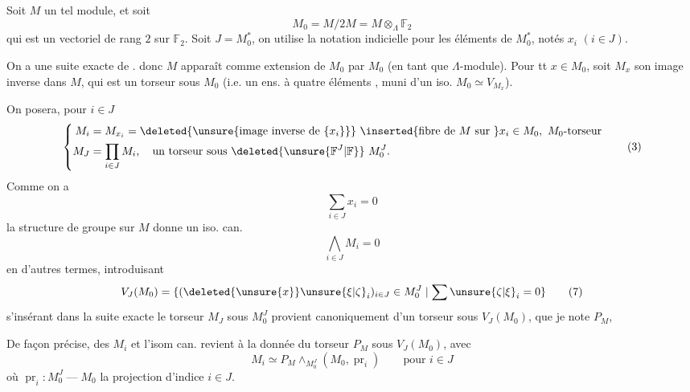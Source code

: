 Soit $M$ un tel module, et soit
\[
M_0=M/2M=M\otimes_\Lambda\mathbb F_2 \tag*{(1)}
\]
qui est un vectoriel de rang $2$ sur $\mathbb F_2$. Soit $J=M_0^*$, on utilise la notation indicielle pour les éléments de $M_0^*$, notés $x_i$ $(i\in J)$. 

On a une suite exacte de  .
donc $M$ apparaît comme extension de $M_0$ par $M_0$ (en tant que $\Lambda$-module). Pour tt $x\in M_0$, soit $M_x$ son image inverse dans $M$, qui est un torseur sous $M_0$ (i.e. un ens. à quatre éléments , muni d'un iso. $M_0\simeq V_{M_x}$).

On posera, pour $i\in J$
\[
\left\{\begin{aligned}
M_i&=M_{x_i}=\deleted{\unsure{\text{image inverse de }\{x_i\}}}\ \inserted{\text{fibre de }M\text{ sur }}x_i\in M_0,\ M_0\text{-torseur}\\
M_J&=\prod_{i\in J}M_i,\quad\text{un torseur sous }\deleted{\unsure{\mathbb F^J|\mathbb F}}\ M_0^J.
\end{aligned}\right. \tag*{(3)}
\]
Comme on a
\[
\sum_{i\in J}x_i=0 \tag*{(4)}
\]
la structure de groupe sur $M$ donne un iso. can.
\[
\bigwedge_{i\in J}M_i=0 \tag*{(6)}
\]
en d'autres termes, introduisant
\[
V_J(M_0)=\{(\deleted{\unsure{x}}\unsure{\xi|\zeta}_i)_{i\in J}\in M_0^J\mid\sum\unsure{\zeta|\xi}_i=0\} \tag*{(7)}
\]
s'insérant dans la suite exacte
le torseur $M_J$ sous $M_0^J$ provient canoniquement d'un torseur sous $V_J(M_0)$, que je note $P_M$,



De façon précise,  des  $M_i$ et  l'isom can.  revient à la donnée du torseur $P_M$ sous $V_J(M_0)$, avec
\[
M_i\simeq P_M\wedge_{M_0^J}(M_0,\operatorname{pr}_i)\qquad\text{pour }i\in J \tag*{(9)}
\]
où $\operatorname{pr}_i:M_0^J\mathrel{\text{---}}M_0$ la projection d'indice $i\in J$.

